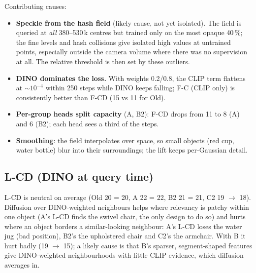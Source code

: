 \documentclass[11pt,a4paper]{article}
\begin{document}
Contributing causes:
\begin{itemize}
  \item \textbf{Speckle from the hash field} (likely cause, not yet isolated). The field is queried at \emph{all} 380--530\,k centres but trained only on the
        most opaque 40\,\%; the fine levels and hash collisions give isolated high values at untrained points, especially
        outside the camera volume where there was no supervision at all. The relative threshold is then set by these
        outliers.
  \item \textbf{DINO dominates the loss.} With weights 0.2/0.8, the CLIP term flattens at $\sim10^{-4}$ within 250 steps
        while DINO keeps falling; F-C (CLIP only) is consistently better than F-CD (15 vs 11 for Old).
  \item \textbf{Per-group heads split capacity} (A, B2): F-CD drops from 11 to 8 (A) and 6 (B2); each head sees a third of
        the steps.
  \item \textbf{Smoothing}: the field interpolates over space, so small objects (red cup, water bottle) blur into their
        surroundings; the lift keeps per-Gaussian detail.
\end{itemize}

\subsection{L-CD (DINO at query time)}
L-CD is neutral on average (Old 20 = 20, A 22 = 22, B2 21 = 21, C2 19 $\rightarrow$ 18). Diffusion over DINO-weighted
neighbours helps where relevancy is patchy within one object (A's L-CD finds the swivel chair, the only design to do so)
and hurts where an object borders a similar-looking neighbour: A's L-CD loses the water jug (bad position), B2's the
upholstered chair and C2's the armchair. With B it hurt badly (19 $\rightarrow$ 15); a likely cause is that B's sparser,
segment-shaped features give DINO-weighted neighbourhoods with little CLIP evidence, which diffusion averages in.
\end{document}
